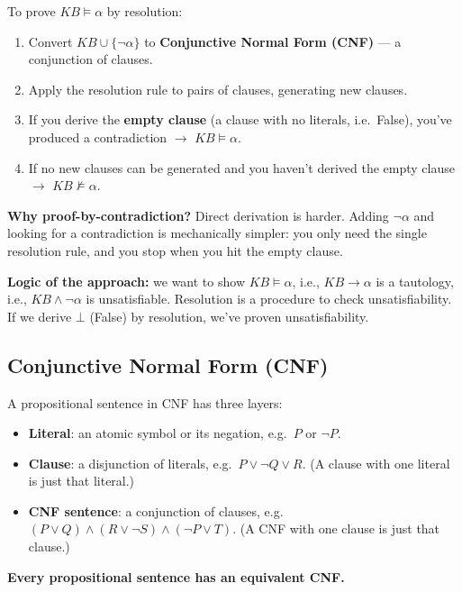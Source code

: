 \documentclass[11pt, a4paper]{article}
\begin{document}
\begin{defbox}
To prove $KB \models \alpha$ by resolution:
\begin{enumerate}
  \item Convert $KB \cup \{\neg \alpha\}$ to \textbf{Conjunctive Normal Form (CNF)} — a conjunction of clauses.
  \item Apply the resolution rule to pairs of clauses, generating new clauses.
  \item If you derive the \textbf{empty clause} (a clause with no literals, i.e.\ False), you've produced a contradiction $\to$ \textbf{$KB \models \alpha$}.
  \item If no new clauses can be generated and you haven't derived the empty clause $\to$ \textbf{$KB \not\models \alpha$}.
\end{enumerate}
\end{defbox}

\textbf{Why proof-by-contradiction?} Direct derivation is harder. Adding $\neg\alpha$ and looking for a contradiction is mechanically simpler: you only need the single resolution rule, and you stop when you hit the empty clause.

\textbf{Logic of the approach:} we want to show $KB \models \alpha$, i.e., $KB \rightarrow \alpha$ is a tautology, i.e., $KB \land \neg\alpha$ is unsatisfiable. Resolution is a procedure to check unsatisfiability. If we derive $\bot$ (False) by resolution, we've proven unsatisfiability.

\subsection{Conjunctive Normal Form (CNF)}

\begin{defbox}
A propositional sentence in CNF has three layers:
\begin{itemize}[itemsep=0pt, topsep=0pt]
  \item \textbf{Literal}: an atomic symbol or its negation, e.g.\ $P$ or $\neg P$.
  \item \textbf{Clause}: a disjunction of literals, e.g.\ $P \lor \neg Q \lor R$. (A clause with one literal is just that literal.)
  \item \textbf{CNF sentence}: a conjunction of clauses, e.g.\ $(P \lor Q) \land (R \lor \neg S) \land (\neg P \lor T)$. (A CNF with one clause is just that clause.)
\end{itemize}
\textbf{Every propositional sentence has an equivalent CNF.}
\end{defbox}
\end{document}
